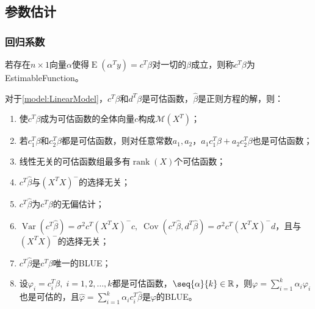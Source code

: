\subsection{参数估计}
\subsubsection{回归系数}
\begin{definition}
	若存在$n\times 1$向量$\alpha$使得$\operatorname{E}(\alpha^Ty)=c^T\beta$对一切的$\beta$成立，则称$c^T\beta$为\gls{EstimableFunction}。
\end{definition}
\begin{property}\label{prop:EstimableFunction}
	对于\cref{model:LinearModel}，$c^T\beta$和$d^T\beta$是可估函数，$\hat{\beta}$是正则方程的解，则：
	\begin{enumerate}
		\item 使$c^T\beta$成为可估函数的全体向量$c$构成$\mathcal{M}(X^T)$；
		\item 若$c_1^T\beta$和$c_2^T\beta$都是可估函数，则对任意常数$a_1,a_2$，$a_1c_1^T\beta+a_2c_2^T\beta$也是可估函数；
		\item 线性无关的可估函数组最多有$\operatorname{rank}(X)$个可估函数；
		\item $c^T\hat{\beta}$与$(X^TX)^-$的选择无关；
		\item $c^T\hat{\beta}$为$c^T\beta$的无偏估计；
		\item  $\operatorname{Var}(c^T\hat{\beta})=\sigma^2c^T(X^TX)^-c,\;\operatorname{Cov}(c^T\hat{\beta},d^T\hat{\beta})=\sigma^2c^T(X^TX)^-d$，且与$(X^TX)^-$的选择无关；
		\item $c^T\hat{\beta}$是$c^T\beta$唯一的BLUE；
		\item 设$\varphi_i=c_i^T\beta,\;i=1,2,\dots,k$都是可估函数，$\seq{\alpha}{k}\in\mathbb{R}^{}$，则$\varphi=\sum\limits_{i=1}^{k}\alpha_i\varphi_i$也是可估的，且$\hat{\varphi}=\sum\limits_{i=1}^{k}\alpha_ic_i^T\hat{\beta}$是$\varphi$的BLUE。
	\end{enumerate}
\end{property}
